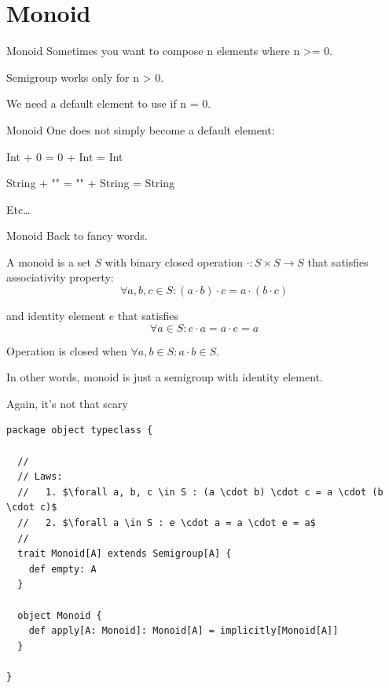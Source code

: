 \documentclass[presentation,aspectratio=169,smaller]{beamer}
\begin{document}
\section*{Monoid}
\label{sec:org1084cc6}

\begin{frame}[label={sec:org1f2d96d}]{Monoid}
Sometimes you want to compose n elements where n >= 0.

Semigroup works only for n > 0.

We need a default element to use if n = 0.
\end{frame}

\begin{frame}[label={sec:org0c0c90d}]{Monoid}
One does not simply become a default element:

Int + 0 = 0 + Int = Int

String + "" = "" + String = String

Etc\ldots{}
\end{frame}

\begin{frame}[label={sec:orgeb273f0}]{Monoid}
Back to fancy words.

\pause

A monoid is a set \(S\) with binary closed operation \(\cdot : S \times S
\rightarrow S\) that satisfies associativity property:
$$\forall a, b, c \in S : (a \cdot b) \cdot c = a \cdot (b \cdot c)$$

and identity element \(e\) that satisfies
$$\forall a \in S : e \cdot a = a \cdot e = a$$

Operation is closed when \(\forall a, b \in S : a \cdot b \in S\).

\pause

In other words, monoid is just a semigroup with identity element.
\end{frame}

\begin{frame}[label={sec:org24dc113},fragile]{Again, it's not that scary}
 \begin{verbatim}
package object typeclass {

  //
  // Laws:
  //   1. $\forall a, b, c \in S : (a \cdot b) \cdot c = a \cdot (b \cdot c)$
  //   2. $\forall a \in S : e \cdot a = a \cdot e = a$
  //
  trait Monoid[A] extends Semigroup[A] {
    def empty: A
  }

  object Monoid {
    def apply[A: Monoid]: Monoid[A] = implicitly[Monoid[A]]
  }

}
\end{verbatim}
\end{frame}
\end{document}
